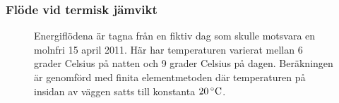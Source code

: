 \subsubsection{Flöde vid termisk jämvikt}


\begin{figure}
\centering

\vspace{5mm}
\caption{Energiflödena är tagna från en fiktiv dag som skulle motsvara en molnfri
15 april 2011. Här har temperaturen varierat mellan 6 grader Celsius på natten och
9 grader Celsius på dagen. Beräkningen är genomförd med finita elementmetoden där
temperaturen på insidan av väggen satts till konstanta $\unit[20]{^\circ C}$.}
\end{figure}

